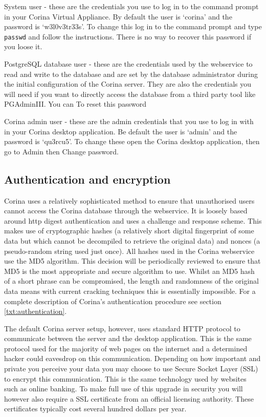\begin{description*}
 \item[System user] - these are the credentials you use to log in to the command prompt in your Corina Virtual Appliance.  By default the user is `corina' and the password is `w3l0v3tr33s'.  To change this log in to the command prompt and type \verb|passwd| and follow the instructions.  There is no way to recover this password if you loose it.
 \item[PostgreSQL database user] - these are the credentials used by the webservice to read and write to the database and are set by the database administrator during the initial configuration of the Corina server. They are also the credentials you will need if you want to directly access the database from a third party tool like PGAdminIII.  You can To reset this password 
 \item[Corina admin user] - these are the admin credentials that you use to log in with in your Corina desktop application.  Be default the user is `admin' and the password is `qu3rcu5'.  To change these open the Corina desktop application, then go to Admin then Change password.
\end{description*}

\subsection{Authentication and encryption}
Corina uses a relatively sophisticated method to ensure that unauthorised users cannot access the Corina database through the webservice.  It is loosely based around http digest authentication and uses a challenge and response scheme.  This makes use of cryptographic hashes (a relatively short digital fingerprint of some data but which cannot be decompiled to retrieve the original data) and nonces (a pseudo-random string used just once). All hashes used in the Corina webservice use the MD5 algorithm. This decision will be periodically reviewed to ensure that MD5 is the most appropriate and secure algorithm to use. Whilst an MD5 hash of a short phrase can be compromised, the length and randomness of the original data means with current cracking techniques this is essentially impossible.   For a complete description of Corina's authentication procedure see section \ref{txt:authentication}.

The default Corina server setup, however, uses standard HTTP protocol to communicate between the server and the desktop application.  This is the same protocol used for the majority of web pages on the internet and a determined hacker could eavesdrop on this communication.  Depending on how important and private you perceive your data you may choose to use Secure Socket Layer (SSL) to encrypt this communication.  This is the same technology used by websites such as online banking.  To make full use of this upgrade in security you will however also require a SSL certificate from an official licensing authority.  These certificates typically cost several hundred dollars per year. 


